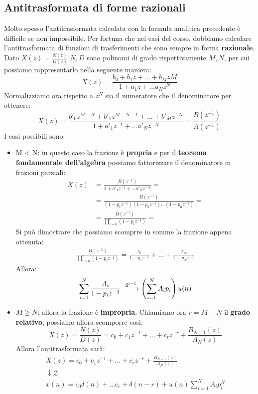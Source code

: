 \subsection{Antitrasformata di forme razionali}
Molto spesso l'antitrasformata calcolata con la formula analitica precedente è difficile se non impossibile. Per fortuna che nei 
casi del corso, dobbiamo calcolare l'antitrasformata di funzioni di trasferimenti che sono sempre in forma \textbf{razionale}.
Dato $X(z) = \frac{N(z)}{D(z)}$ $N,D$ sono polinomi di grado rispettivamente $M,N$, per cui possiamo rappresentarlo nella seguente maniera:
\begin{equation*}
    X(z) = \frac{b_0 + b_1z + \dots + b_MzM}{1 + a_1z + \dots a_Nz^N}
\end{equation*}
Normalizziamo ora rispetto a $z^N$ sia il numeratore che il denominatore per ottenere:
\begin{equation*}
    X(z) = \frac{b'_0z^{M - N} + b'_1z^{M - N - 1} + \dots + b'_Mz^{-N}}{1 + a'_1z^{-1} + \dots a'_Nz^{-N}} = \frac{B(z^{-1})}{A(z^{-1})}
\end{equation*}
I casi possibili sono:
\begin{itemize}
    \item M < N: in questo caso la frazione è \textbf{propria} e per il \textbf{teorema fondamentale dell'algebra} possiamo fattorizzare il denominatore in frazioni parziali:
    \begin{align*}
        X(z) &= \frac{B(z^{-1})}{1 + a'_1z^{-1} + \dots a'_Nz^{-N}} = \\
             &= \frac{B(z^{-1})}{(1 - p_1z^{-1})(1 - p_2z^{-1})\dots(1 - p_nz^{-1})}=\\
             &= \frac{B(z^{-1})}{\prod_{i = 0}^{n} (1 - p_iz^{-1})}=
    \end{align*}
    Si può dimostrare che possiamo scomprre in somme la frazione appena ottenuta:
    \begin{gather*}
        \frac{B(z^{-1})}{\prod_{i = 0}^{n} (1 - p_iz^{-1})} = \frac{A_1}{1 - p_1z^{-1}} + \dots + \frac{A_N}{1 - p_Nz^{-1}}
    \end{gather*}
    Allora:
    \begin{equation}
        \sum_{i = 1}^{N} \frac{A_i}{1 - p_iz^{-1}} \xrightarrow{\mathscr{Z}^{-1}} \left(\sum_{i = 1}^{N}A_i p_i\right) u(n)
    \end{equation}

    \item $M \geq N$: allora la frazione è \textbf{impropria}. Chiamiamo ora $r = M - N$ il \textbf{grado relativo}, possiamo allora scomporre così:
    \begin{equation}
        X(z) = \frac{N(z)}{D(z)} = c_0 + c_1z^{-1} + \dots + c_rz^{-r} + \frac{B_{N - 1}(z)}{A_N(z)}
    \end{equation}
    Allora l'antitrasformata sarà:
    \begin{gather*}
        X(z) = c_0 + c_1z^{-1} + \dots + c_rz^{-r} + \frac{B_{N - 1}(z)}{A_N(z)}
        \\\downarrow \mathscr{Z}\\
        x(n) = c_0 \delta(n) + \dots c_r + \delta(n - r) + u(n)\sum_{i = 1}^{N} A_i p_i^N
    \end{gather*}
\end{itemize}

